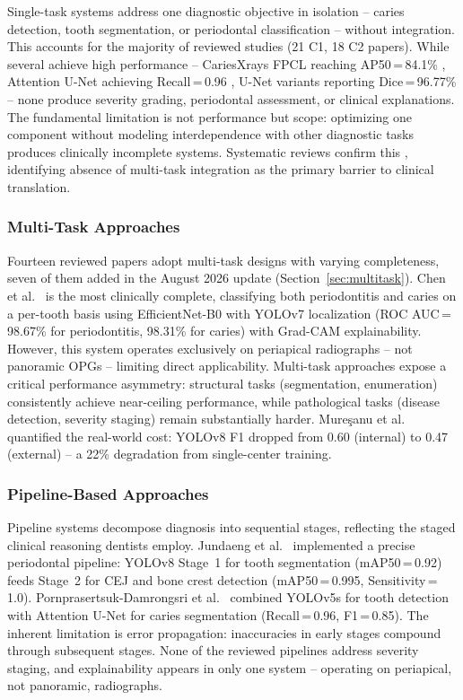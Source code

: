 \documentclass[conference]{IEEEtran}
\begin{document}
Single-task systems address one diagnostic objective in isolation --
caries detection, tooth segmentation, or periodontal classification --
without integration. This accounts for the majority of reviewed studies
(21 C1, 18 C2 papers). While several achieve high performance --
CariesXrays FPCL reaching AP50\,=\,84.1\% \cite{chen2024cariesxrays},
Attention U-Net achieving Recall\,=\,0.96
\cite{pornprasertsuk2025clinical}, U-Net variants reporting
Dice\,=\,96.77\% \cite{vickram2025extraction} -- none produce severity
grading, periodontal assessment, or clinical explanations. The
fundamental limitation is not performance but scope: optimizing one
component without modeling interdependence with other diagnostic tasks
produces clinically incomplete systems. Systematic reviews confirm this
\cite{albano2024artificial,zanini2024systematic}, identifying absence
of multi-task integration as the primary barrier to clinical
translation.

\subsubsection{Multi-Task Approaches}

Fourteen reviewed papers adopt multi-task designs with varying
completeness, seven of them added in the August 2026 update
(Section~\ref{sec:multitask}). Chen et al.\ \cite{chen2023deep} is the most clinically
complete, classifying both periodontitis and caries on a per-tooth
basis using EfficientNet-B0 with YOLOv7 localization (ROC
AUC\,=\,98.67\% for periodontitis, 98.31\% for caries) with Grad-CAM
explainability. However, this system operates exclusively on periapical
radiographs -- not panoramic OPGs -- limiting direct applicability.
Multi-task approaches expose a critical performance asymmetry:
structural tasks (segmentation, enumeration) consistently achieve
near-ceiling performance, while pathological tasks (disease detection,
severity staging) remain substantially harder. Mure\c{s}anu et al.\
\cite{muresanu2024automating} quantified the real-world cost: YOLOv8
F1 dropped from 0.60 (internal) to 0.47 (external) -- a 22\%
degradation from single-center training.

\subsubsection{Pipeline-Based Approaches}

Pipeline systems decompose diagnosis into sequential stages, reflecting
the staged clinical reasoning dentists employ. Jundaeng et al.\
\cite{jundaeng2025advanced} implemented a precise periodontal pipeline:
YOLOv8 Stage~1 for tooth segmentation (mAP50\,=\,0.92) feeds Stage~2
for CEJ and bone crest detection (mAP50\,=\,0.995,
Sensitivity\,=\,1.0). Pornprasertsuk-Damrongsri et al.\
\cite{pornprasertsuk2025clinical} combined YOLOv5s for tooth detection
with Attention U-Net for caries segmentation (Recall\,=\,0.96,
F1\,=\,0.85). The inherent limitation is error propagation:
inaccuracies in early stages compound through subsequent stages. None
of the reviewed pipelines address severity staging, and explainability
appears in only one system \cite{chen2023deep} -- operating on
periapical, not panoramic, radiographs.
\end{document}
